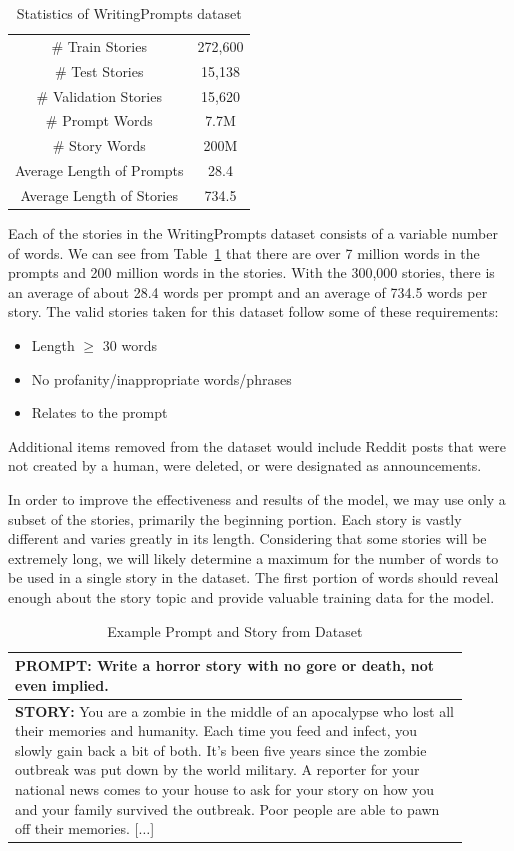 \documentclass[letterpaper]{article}
\begin{document}
\begin{table}[htbp]
\centering
\begin{tabular}{c c}
\hline
\# Train Stories & 272,600 \\
\# Test Stories & 15,138 \\
\# Validation Stories & 15,620 \\
\hline
\# Prompt Words & 7.7M \\
\# Story Words & 200M \\
\hline
Average Length of Prompts & 28.4 \\
Average Length of Stories & 734.5 \\
\hline
\end{tabular}
\caption{Statistics of WritingPrompts dataset}
\label{table:stat}
\end{table}


Each of the stories in the WritingPrompts dataset consists of a variable number of words. We can see from Table~\ref{table:stat} that there are over 7 million words in the prompts and 200 million words in the stories. With the 300,000 stories, there is an average of about 28.4 words per prompt and an average of 734.5 words per story. The valid stories taken for this dataset follow some of these requirements:
\begin{itemize}
    \item Length $\geq$ 30 words
    \item No profanity/inappropriate words/phrases
    \item Relates to the prompt
\end{itemize}
Additional items removed from the dataset would include Reddit posts that were not created by a human, were deleted, or were designated as announcements.

In order to improve the effectiveness and results of the model, we may use only a subset of the stories, primarily the beginning portion. Each story is vastly different and varies greatly in its length. Considering that some stories will be extremely long, we will likely determine a maximum for the number of words to be used in a single story in the dataset. The first portion of words should reveal enough about the story topic and provide valuable training data for the model. 

\begin{table}[htbp]
\centering
\begin{tabular}{p{0.9\linewidth}}
\hline
\noindent \textbf{PROMPT:} Write a horror story with no gore or death, not even implied. \\
\hline
\noindent \textbf{STORY:} You are a zombie in the middle of an apocalypse who lost all their memories and humanity. Each time you feed and infect, you slowly gain back a bit of both. It's been five years since the zombie outbreak was put down by the world military. A reporter for your national news comes to your house to ask for your story on how you and your family survived the outbreak. Poor people are able to pawn off their memories. [$\dots$] \\
\hline
\end{tabular}
\caption{Example Prompt and Story from Dataset}
\label{table:example}
\end{table}
\end{document}
